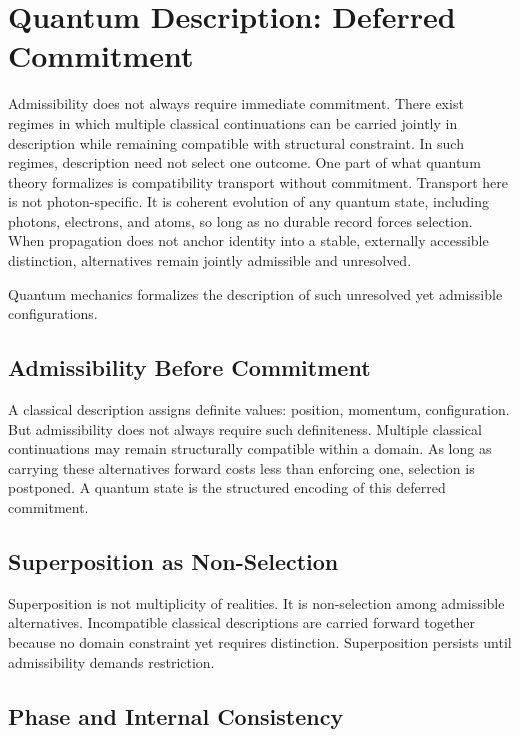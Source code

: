 \documentclass[11pt,twoside,openright]{book}
\begin{document}
\chapter{Quantum Description: Deferred Commitment}

Admissibility does not always require immediate commitment. There exist regimes in which multiple classical continuations can be carried jointly in description while remaining compatible with structural constraint. In such regimes, description need not select one outcome. One part of what quantum theory formalizes is compatibility transport without commitment. Transport here is not photon-specific. It is coherent evolution of any quantum state, including photons, electrons, and atoms, so long as no durable record forces selection. When propagation does not anchor identity into a stable, externally accessible distinction, alternatives remain jointly admissible and unresolved.

Quantum mechanics formalizes the description of such unresolved yet admissible configurations.

\section*{Admissibility Before Commitment}

A classical description assigns definite values: position, momentum, configuration. But admissibility does not always require such definiteness. Multiple classical continuations may remain structurally compatible within a domain. As long as carrying these alternatives forward costs less than enforcing one, selection is postponed. A quantum state is the structured encoding of this deferred commitment.

\section*{Superposition as Non-Selection}

Superposition is not multiplicity of realities. It is non-selection among admissible alternatives. Incompatible classical descriptions are carried forward together because no domain constraint yet requires distinction. Superposition persists until admissibility demands restriction.

\section*{Phase and Internal Consistency}
\end{document}
